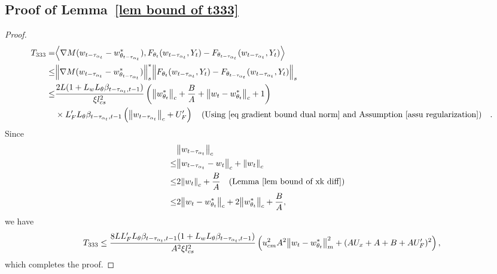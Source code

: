 \documentclass[twoside,11pt]{article}
\newcommand{\indot}[2]{{\left<#1, #2\right>}}
\numberwithin{assucounter}{section}
\begin{document}
\subsection{Proof of Lemma~\ref{lem bound of t333}}
\label{sec proof lem bound t333}
\lemboundoftthreethreethree*
\begin{proof}
  \begin{align}
      T_{333} = &\indot{\nabla M(w_{t-\tau_{\alpha_t}} - w^*_{\theta_{t-\tau_{\alpha_t}}})}{F_{\theta_{t}}(w_{t- \tau_{\alpha_t}}, Y_t) -F_{\theta_{t - \tau_{\alpha_t}}}(w_{t- \tau_{\alpha_t}}, Y_t)}  \\
      \leq &\norm{\nabla M(w_{t-\tau_{\alpha_t}} - w^*_{\theta_{t-\tau_{\alpha_t}}})}_s^* \norm{F_{\theta_{t}}(w_{t- \tau_{\alpha_t}}, Y_t) -F_{\theta_{t - \tau_{\alpha_t}}}(w_{t- \tau_{\alpha_t}}, Y_t)}_s  \\
      \leq & \frac{2L(1 + L_wL_\theta \beta_{t-\tau_{\alpha_t}, t-1})}{\xi l_{cs}^2}\left(\norm{w^*_{\theta_t}}_c + \frac{B}{A} + \norm{w_t - w^*_{\theta_t}}_c + 1\right) \\
      &\times L_F' L_\theta \beta_{t-\tau_{\alpha_t}, t-1} \left(\norm{w_{t-\tau_{\alpha_t}}}_c + U_F' \right) \qq{(Using \eqref{eq gradient bound dual norm} and Assumption \ref{assu regularization})}.
  \end{align}
Since 
\begin{align}
  \label{eq tmp 3}
  &\norm{w_{t-\tau_{\alpha_t}}}_c \\
  \leq & \norm{w_{t-\tau_{\alpha_t}} - w_t}_c + \norm{w_t}_c \\
  \leq & 2\norm{w_t}_c + \frac{B}{A} \qq{(Lemma \ref{lem bound of xk diff})} \\
  \leq & 2\norm{w_t - w^*_{\theta_t}}_c + 2\norm{w^*_{\theta_t}}_c + \frac{B}{A},
\end{align}
we have
\begin{align}
  T_{333} \leq \frac{8LL_F' L_\theta \beta_{t-\tau_{\alpha_t}, t-1} (1 + L_wL_\theta \beta_{t-\tau_{\alpha_t}, t-1})}{A^2 \xi l_{cs}^2}\left(u_{cm}^2 A^2 \norm{w_t - w^*_{\theta_t}}_m^2 + (AU_x + A + B + AU_F')^2\right),
\end{align}
which completes the proof.
\end{proof}
\end{document}
